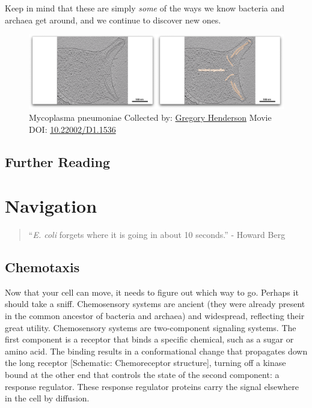\documentclass[]{tufte-book}
\begin{document}
Keep in mind that these are simply \emph{some} of the ways we know
bacteria and archaea get around, and we continue to discover new ones.





\begin{figure}
\includegraphics{movie_stills/6_12} \caption[Mycoplasma pneumoniae Collected by:
\protect\hyperlink{gregory_henderson}{Gregory Henderson} Movie DOI:
\href{https://doi.org/10.22002/D1.1536}{10.22002/D1.1536}]{Mycoplasma pneumoniae Collected by:
\protect\hyperlink{gregory_henderson}{Gregory Henderson} Movie DOI:
\href{https://doi.org/10.22002/D1.1536}{10.22002/D1.1536}}\label{fig:6-12}
\end{figure}

\section{Further Reading}\label{further-reading-5}

\citep{albers2018}

\citep{berg2003}

\citep{jarrell2008}

\citep{munoz-dorado2016}

\citep{shrivastava2015}

\chapter{Navigation}\label{navigation}

\begin{quote}
``\emph{E. coli} forgets where it is going in about 10 seconds.'' -
Howard Berg \citep{berg1988}
\end{quote}

\section{Chemotaxis}\label{chemotaxis}

Now that your cell can move, it needs to figure out which way to go.
Perhaps it should take a sniff. Chemosensory systems are ancient (they
were already present in the common ancestor of bacteria and archaea) and
widespread, reflecting their great utility. Chemosensory systems are
two-component signaling systems. The first component is a receptor that
binds a specific chemical, such as a sugar or amino acid. The binding
results in a conformational change that propagates down the long
receptor {[}Schematic: Chemoreceptor structure{]}, turning off a kinase
bound at the other end that controls the state of the second component:
a response regulator. These response regulator proteins carry the signal
elsewhere in the cell by diffusion.
\end{document}

